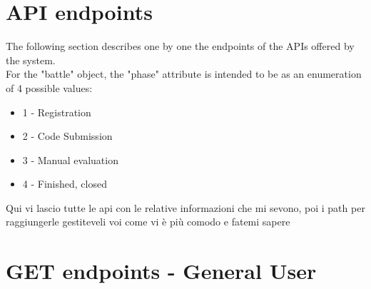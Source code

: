 \section{API endpoints}

\lstset{
    basicstyle=\ttfamily\footnotesize,
    showstringspaces=false,
    tabsize=2,
    breaklines=true
}

The following section describes one by one the endpoints of the APIs offered by the system.\\
For the "battle" object, the "phase" attribute is intended to be as an enumeration of 4 possible values:
\begin{itemize}
    \item 1 - Registration
    \item 2 - Code Submission
    \item 3 - Manual evaluation
    \item 4 - Finished, closed
\end{itemize}

{\color{red} Qui vi lascio tutte le api con le relative informazioni che mi sevono, poi i path per raggiungerle gestiteveli voi come vi è più comodo e fatemi sapere}

\section*{GET endpoints - General User}


